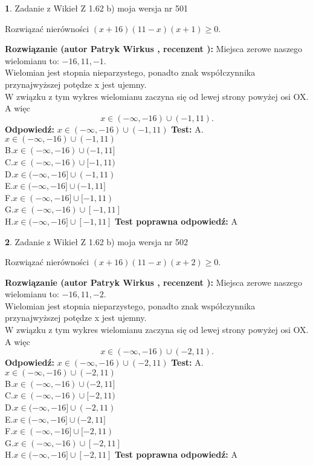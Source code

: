 \documentclass[12pt, a4paper]{article}
\theoremstyle{definition} %
\newtheorem{zad}{}
\newcommand{\zadStart}[1]{\begin{zad}#1\newline}
\newcommand{\zadStop}{\end{zad}}
\newcommand{\rozwStart}[2]{\noindent \textbf{Rozwiązanie (autor #1 , recenzent #2): }\newline}
\newcommand{\rozwStop}{\newline}
\newcommand{\odpStart}{\noindent \textbf{Odpowiedź:}\newline}
\newcommand{\odpStop}{\newline}
\newcommand{\testStart}{\noindent \textbf{Test:}\newline}
\newcommand{\testStop}{\newline}
\newcommand{\kluczStart}{\noindent \textbf{Test poprawna odpowiedź:}\newline}
\newcommand{\kluczStop}{\newline}
\begin{document}
\zadStart{Zadanie z Wikieł Z 1.62 b) moja wersja nr 501}

Rozwiązać nierówności $(x+16)(11-x)(x+1)\ge0$.
\zadStop
\rozwStart{Patryk Wirkus}{}
Miejsca zerowe naszego wielomianu to: $-16, 11, -1$.\\
Wielomian jest stopnia nieparzystego, ponadto znak współczynnika przy\linebreak najwyższej potędze x jest ujemny.\\ W związku z tym wykres wielomianu zaczyna się od lewej strony powyżej osi OX. A więc $$x \in (-\infty,-16) \cup (-1,11).$$
\rozwStop
\odpStart
$x \in (-\infty,-16) \cup (-1,11)$
\odpStop
\testStart
A.$x \in (-\infty,-16) \cup (-1,11)$\\
B.$x \in (-\infty,-16) \cup (-1,11]$\\
C.$x \in (-\infty,-16) \cup [-1,11)$\\
D.$x \in (-\infty,-16] \cup (-1,11)$\\
E.$x \in (-\infty,-16] \cup (-1,11]$\\
F.$x \in (-\infty,-16] \cup [-1,11)$\\
G.$x \in (-\infty,-16) \cup [-1,11]$\\
H.$x \in (-\infty,-16] \cup [-1,11]$
\testStop
\kluczStart
A
\kluczStop



\zadStart{Zadanie z Wikieł Z 1.62 b) moja wersja nr 502}

Rozwiązać nierówności $(x+16)(11-x)(x+2)\ge0$.
\zadStop
\rozwStart{Patryk Wirkus}{}
Miejsca zerowe naszego wielomianu to: $-16, 11, -2$.\\
Wielomian jest stopnia nieparzystego, ponadto znak współczynnika przy\linebreak najwyższej potędze x jest ujemny.\\ W związku z tym wykres wielomianu zaczyna się od lewej strony powyżej osi OX. A więc $$x \in (-\infty,-16) \cup (-2,11).$$
\rozwStop
\odpStart
$x \in (-\infty,-16) \cup (-2,11)$
\odpStop
\testStart
A.$x \in (-\infty,-16) \cup (-2,11)$\\
B.$x \in (-\infty,-16) \cup (-2,11]$\\
C.$x \in (-\infty,-16) \cup [-2,11)$\\
D.$x \in (-\infty,-16] \cup (-2,11)$\\
E.$x \in (-\infty,-16] \cup (-2,11]$\\
F.$x \in (-\infty,-16] \cup [-2,11)$\\
G.$x \in (-\infty,-16) \cup [-2,11]$\\
H.$x \in (-\infty,-16] \cup [-2,11]$
\testStop
\kluczStart
A
\kluczStop
\end{document}
